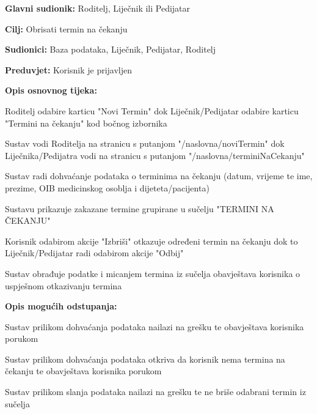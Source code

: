 							
							
							
				\noindent {}
					\begin{packed_item}
						
						\item \textbf{Glavni sudionik: }Roditelj, Liječnik ili Pedijatar
						\item  \textbf{Cilj:} Obrisati termin na čekanju
						\item  \textbf{Sudionici:} Baza podataka, Liječnik, Pedijatar, Roditelj
						\item  \textbf{Preduvjet:} Korisnik je prijavljen
						\item  \textbf{Opis osnovnog tijeka:}
						
						\item[] \begin{packed_enum}
							\item Roditelj odabire karticu "Novi Termin" dok Liječnik/Pedijatar odabire karticu "Termini na čekanju" kod bočnog izbornika
							\item Sustav vodi Roditelja na stranicu s putanjom "/naslovna/noviTermin" dok Liječnika/Pedijatra vodi na stranicu s putanjom "/naslovna/terminiNaCekanju"
							\item Sustav radi dohvaćanje podataka o terminima na čekanju (datum, vrijeme te ime, prezime, OIB medicinskog osoblja i dijeteta/pacijenta)
							\item Sustavu prikazuje zakazane termine grupirane u sučelju "TERMINI NA ČEKANJU"
							\item Korisnik odabirom akcije "Izbriši" otkazuje određeni termin na čekanju dok to Liječnik/Pedijatar radi odabirom akcije "Odbij"
							\item Sustav obrađuje podatke i micanjem termina iz sučelja obavještava korisnika o uspješnom otkazivanju termina
						\end{packed_enum}
						
						\item  \textbf{Opis mogućih odstupanja:}
						
						\item[] \begin{packed_item}
							\item[3.a] Sustav prilikom dohvaćanja podataka nailazi na grešku te obavještava korisnika porukom
							
							\item[3.b] Sustav prilikom dohvaćanja podataka otkriva da korisnik nema termina na čekanju te obavještava korisnika porukom	
							
							\item[6.a] Sustav prilikom slanja podataka nailazi na grešku te ne briše odabrani termin iz sučelja
						\end{packed_item}
					\end{packed_item}		
					
